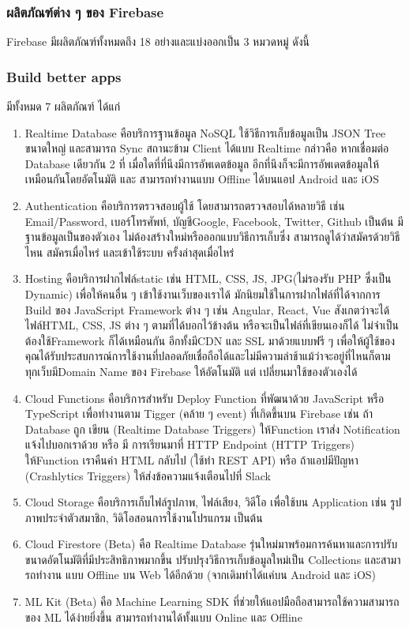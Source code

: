 \subsubsection{ผลิตภัณฑ์ต่าง ๆ ของ Firebase}
Firebase มีผลิตภัณฑ์ทั้งหมดถึง 18 อย่างและแบ่งออกเป็น 3 หมวดหมู่ ดังนี้

\subsubsection{Build better apps}
มีทั้งหมด 7 ผลิตภัณฑ์ ได้แก่
\begin{enumerate}
  \item Realtime Database คือบริการฐานข้อมูล NoSQL ใช้วิธีการเก็บข้อมูลเป็น JSON Tree
  ขนาดใหญ่ และสามารถ Sync สถานะข้าม Client ได้แบบ Realtime กล่าวคือ หากเชื่อมต่อ Database
  เดียวกัน 2 ที่ เมื่อใดที่ที่นึงมีการอัพเดตข้อมูล อีกที่นึงก็จะมีการอัพเดตข้อมูลให้เหมือนกันโดยอัตโนมัติ และ
  สามารถทํางานแบบ Offline ได้บนแอป Android และ iOS
  
  \item Authentication คือบริการตรวจสอบผู้ใช้ โดยสามารถตรวจสอบได้หลายวิธี เช่น Email/Password, เบอร์โทรศัพท์, บัญชีGoogle, Facebook, Twitter, Github เป็นต้น มีฐานข้อมูลเป็นของตัวเอง
  ไม่ต้องสร้างใหม่หรือออกแบบวิธีการเก็บซึ่ง สามารถดูได้ว่าสมัครด้วยวิธีไหน สมัครเมื่อไหร่ และเข้าใช้ระบบ
  ครั้งล่าสุดเมื่อไหร่
  
  \item  Hosting คือบริการฝากไฟล์static เช่น HTML, CSS, JS, JPG(ไม่รองรับ PHP ซึ่งเป็น
  Dynamic) เพื่อให้คนอื่น ๆ เข้าใช้งานเว็บของเราได้ มักนิยมใช้ในการฝากไฟล์ที่ได้จากการ Build ของ
  JavaScript Framework ต่าง ๆ เช่น Angular, React, Vue สังเกตว่าจะได้ไฟล์HTML, CSS, JS
  ต่าง ๆ ตามที่ได้บอกไว้ข้างต้น หรือจะเป็นไฟล์ที่เขียนเองก็ได้ ไม่จําเป็นต้องใช้Framework ก็ได้เหมือนกัน
  อีกทั้งมีCDN และ SSL มาด้วยแบบฟรี ๆ เพื่อให้ผู้ใช้ของคุณได้รับประสบการณ์การใช้งานที่ปลอดภัยเชื่อถือได้และไม่มีความล่าช้าแม้ว่าจะอยู่ที่ไหนก็ตาม ทุกเว็บมีDomain Name ของ Firebase ให้อัตโนมัติ แต่
  เปลี่ยนมาใช้ของตัวเองได้

  \item Cloud Functions คือบริการสําหรับ Deploy Function ที่พัฒนาด้วย JavaScript หรือ
TypeScript เพื่อทํางานตาม Tigger (คล้าย ๆ event) ที่เกิดขึ้นบน Firebase เช่น ถ้า Database ถูก
เขียน (Realtime Database Triggers) ให้Function เราส่ง Notification แจ้งไปบอกเราด้วย หรือ มี
การเรียนมาที่ HTTP Endpoint (HTTP Triggers) ให้Function เราคืนค่า HTML กลับไป (ใช้ทํา
REST API) หรือ ถ้าแอปมีปัญหา (Crashlytics Triggers) ให้ส่งข้อความแจ้งเตือนไปที่ Slack

  \item Cloud Storage คือบริการเก็บไฟล์รูปภาพ, ไฟล์เสียง, วิดีโอ เพื่อใช้บน Application เช่น
  รูปภาพประจําตัวสมาชิก, วิดิโอสอนการใช้งานโปรแกรม เป็นต้น
  \item Cloud Firestore (Beta) คือ Realtime Database รุ่นใหม่มาพร้อมการค้นหาและการปรับ
  ขนาดอัตโนมัติที่มีประสิทธิภาพมากขึ้น ปรับปรุงวิธีการเก็บข้อมูลใหม่เป็น Collections และสามารถทํางาน
  แบบ Offline บน Web ได้อีกด้วย (จากเดิมทําได้แค่บน Android และ iOS)
  \item ML Kit (Beta) คือ Machine Learning SDK ที่ช่วยให้แอปมือถือสามารถใช้ความสามารถ
  ของ ML ได้ง่ายยิ่งขึ้น สามารถทํางานได้ทั้งแบบ Online และ Offline
\end{enumerate}

